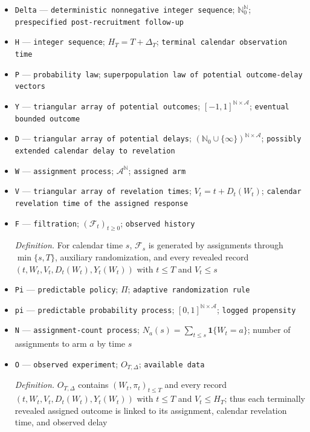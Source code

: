 \documentclass{article}
\begin{document}
\begin{itemize}
  \item \texttt{Delta} --- \texttt{deterministic nonnegative integer sequence}; \(\mathbb N_0^{\mathbb N}\); \texttt{prespecified post-\allowbreak{}recruitment follow-\allowbreak{}up}
  \item \texttt{H} --- \texttt{integer sequence}; \(H_T=T+\Delta_T\); \texttt{terminal calendar observation time}
  \item \texttt{P} --- \texttt{probability law}; \texttt{superpopulation law of potential outcome-\allowbreak{}delay vectors}
  \item \texttt{Y} --- \texttt{triangular array of potential outcomes}; \([-1,1]^{\mathbb N\times\mathcal A}\); \texttt{eventual bounded outcome}
  \item \texttt{D} --- \texttt{triangular array of potential delays}; \((\mathbb N_0\cup\{\infty\})^{\mathbb N\times\mathcal A}\); \texttt{possibly extended calendar delay to revelation}
  \item \texttt{W} --- \texttt{assignment process}; \(\mathcal A^{\mathbb N}\); \texttt{assigned arm}
  \item \texttt{V} --- \texttt{triangular array of revelation times}; \(V_t=t+D_t(W_t)\); \texttt{calendar revelation time of the assigned response}
  \item \texttt{F} --- \texttt{filtration}; \((\mathcal F_t)_{t\geq0}\); \texttt{observed history}
  \par\smallskip\noindent\emph{Definition.} For calendar time \(s\), \(\mathcal F_s\) is generated by assignments through \(\min\{s,T\}\), auxiliary randomization, and every revealed record \((t,W_t,V_t,D_t(W_t),Y_t(W_t))\) with \(t\leq T\) and \(V_t\leq s\)
  \item \texttt{Pi} --- \texttt{predictable policy}; \(\Pi\); \texttt{adaptive randomization rule}
  \item \texttt{pi} --- \texttt{predictable probability process}; \([0,1]^{\mathbb N\times\mathcal A}\); \texttt{logged propensity}
  \item \texttt{N} --- \texttt{assignment-\allowbreak{}count process}; \(N_a(s)=\sum_{t\leq s}\mathbf 1\{W_t=a\}\); number of assignments to arm \(a\) by time \(s\)
  \item \texttt{O} --- \texttt{observed experiment}; \(O_{T,\Delta}\); \texttt{available data}
  \par\smallskip\noindent\emph{Definition.} \(O_{T,\Delta}\) contains \((W_t,\pi_t)_{t\leq T}\) and every record \((t,W_t,V_t,D_t(W_t),Y_t(W_t))\) with \(t\leq T\) and \(V_t\leq H_T\); thus each terminally revealed assigned outcome is linked to its assignment, calendar revelation time, and observed delay

\end{itemize}
\end{document}
